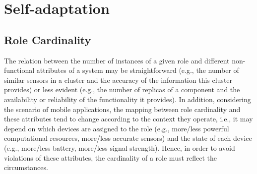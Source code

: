 


%
%
%
%
%
%

\section{Self-adaptation}\label{sec:self_adaptation}

\subsection{Role Cardinality} 

The relation between the number of instances of a given role and different non-functional attributes of a system may be straightforward (e.g., the number of similar sensors in a cluster and the accuracy of the information this cluster provides) or less evident (e.g., the number of replicas of a component and the availability or reliability of the functionality it provides). In addition, considering the scenario of mobile applications, the mapping between role cardinality and these attributes tend to change according to the context they operate, i.e., it may depend on which devices are assigned to the role (e.g., more/less powerful computational resources, more/less accurate sensors) and the state of each device (e.g., more/less battery, more/less signal strength). Hence, in order to avoid violations of these attributes, the cardinality of a role must reflect the circumstances. %

